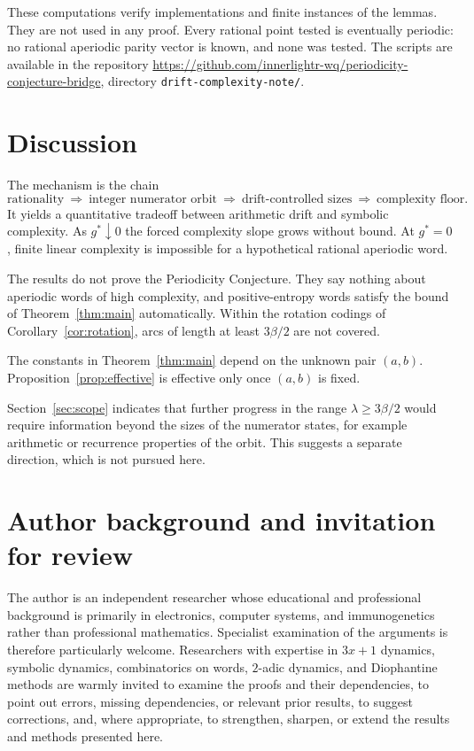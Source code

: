 \documentclass[11pt]{amsart}
\theoremstyle{definition}
\theoremstyle{remark}
\newcommand{\gs}{g^{*}}
\begin{document}
These computations verify implementations and finite instances of the lemmas. They are not used in any proof. Every rational point tested is eventually periodic: no rational aperiodic parity vector is known, and none was tested. The scripts are available in the repository \url{https://github.com/innerlightr-wq/periodicity-conjecture-bridge}, directory \texttt{drift-complexity-note/}.

\section{Discussion}\label{sec:discussion}

The mechanism is the chain
\[
\text{rationality}\ \Longrightarrow\ \text{integer numerator orbit}\ \Longrightarrow\ \text{drift-controlled sizes}\ \Longrightarrow\ \text{complexity floor}.
\]
It yields a quantitative tradeoff between arithmetic drift and symbolic complexity. As $\gs\downarrow0$ the forced complexity slope grows without bound. At $\gs=0$, finite linear complexity is impossible for a hypothetical rational aperiodic word.

The results do not prove the Periodicity Conjecture. They say nothing about aperiodic words of high complexity, and positive-entropy words satisfy the bound of Theorem~\ref{thm:main} automatically. Within the rotation codings of Corollary~\ref{cor:rotation}, arcs of length at least $3\beta/2$ are not covered.

The constants in Theorem~\ref{thm:main} depend on the unknown pair $(a,b)$. Proposition~\ref{prop:effective} is effective only once $(a,b)$ is fixed.

Section~\ref{sec:scope} indicates that further progress in the range $\lambda\ge3\beta/2$ would require information beyond the sizes of the numerator states, for example arithmetic or recurrence properties of the orbit. This suggests a separate direction, which is not pursued here.

\section*{Author background and invitation for review}

The author is an independent researcher whose educational and professional background is primarily in electronics, computer systems, and immunogenetics rather than professional mathematics. Specialist examination of the arguments is therefore particularly welcome. Researchers with expertise in $3x+1$ dynamics, symbolic dynamics, combinatorics on words, $2$-adic dynamics, and Diophantine methods are warmly invited to examine the proofs and their dependencies, to point out errors, missing dependencies, or relevant prior results, to suggest corrections, and, where appropriate, to strengthen, sharpen, or extend the results and methods presented here.
\end{document}
